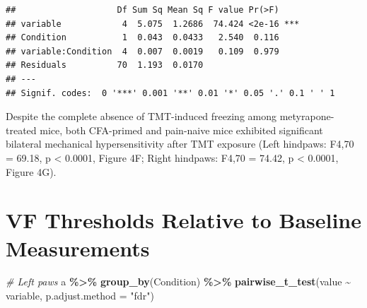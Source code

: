 \documentclass[
]{book}
\newenvironment{Shaded}{\begin{snugshade}}{\end{snugshade}}
\newcommand{\AttributeTok}[1]{\textcolor[rgb]{0.13,0.29,0.53}{#1}}
\newcommand{\CommentTok}[1]{\textcolor[rgb]{0.56,0.35,0.01}{\textit{#1}}}
\newcommand{\FunctionTok}[1]{\textcolor[rgb]{0.13,0.29,0.53}{\textbf{#1}}}
\newcommand{\NormalTok}[1]{#1}
\newcommand{\SpecialCharTok}[1]{\textcolor[rgb]{0.81,0.36,0.00}{\textbf{#1}}}
\newcommand{\StringTok}[1]{\textcolor[rgb]{0.31,0.60,0.02}{#1}}
\begin{document}
\begin{verbatim}
##                    Df Sum Sq Mean Sq F value Pr(>F)    
## variable            4  5.075  1.2686  74.424 <2e-16 ***
## Condition           1  0.043  0.0433   2.540  0.116    
## variable:Condition  4  0.007  0.0019   0.109  0.979    
## Residuals          70  1.193  0.0170                   
## ---
## Signif. codes:  0 '***' 0.001 '**' 0.01 '*' 0.05 '.' 0.1 ' ' 1
\end{verbatim}

Despite the complete absence of TMT-induced freezing among metyrapone-treated mice, both CFA-primed and pain-naive mice exhibited significant bilateral mechanical hypersensitivity after TMT exposure (Left hindpaws: F4,70 = 69.18, p \textless{} 0.0001, Figure 4F; Right hindpaws: F4,70 = 74.42, p \textless{} 0.0001, Figure 4G).

\section*{VF Thresholds Relative to Baseline Measurements}\label{vf-thresholds-relative-to-baseline-measurements}

\begin{Shaded}
\begin{Highlighting}[]
\CommentTok{\# Left paws }
\NormalTok{a }\SpecialCharTok{\%\textgreater{}\%}
  \FunctionTok{group\_by}\NormalTok{(Condition) }\SpecialCharTok{\%\textgreater{}\%}
  \FunctionTok{pairwise\_t\_test}\NormalTok{(value }\SpecialCharTok{\textasciitilde{}}\NormalTok{ variable, }\AttributeTok{p.adjust.method =} \StringTok{"fdr"}\NormalTok{)}
\end{Highlighting}
\end{Shaded}
\end{document}
